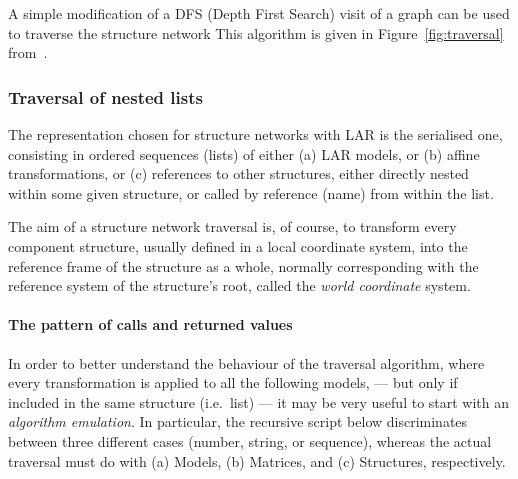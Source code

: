 \documentclass[11pt,oneside]{article}	%
\begin{document}
A simple modification of a DFS (Depth First Search) visit of a graph can be used to traverse the structure network This algorithm is given in Figure~\ref{fig:traversal} from~\cite{Paoluzzi2003a}. 

\subsubsection{Traversal of nested lists}

The representation chosen for structure networks with LAR is the serialised one, consisting in ordered sequences (lists) of either (a) LAR models, or (b) affine transformations, or (c) references to other structures, either directly nested within some given structure, or called by reference (name) from within the list.

The aim of a structure network traversal is, of course, to transform every component structure, usually defined in a local coordinate system, into the reference frame of the structure as a whole, normally corresponding with the reference system of the structure's root, called the \emph{world coordinate} system.

\paragraph{The pattern of calls and returned values}

In order to better understand the behaviour of the traversal algorithm, where every transformation is applied to all the following models, --- but only if included in the same structure  (i.e.~list) --- it may be very useful to start with an \emph{algorithm emulation}. In particular, the recursive script below discriminates between three different cases (number, string, or sequence), whereas the actual traversal must do with (a) Models, (b) Matrices, and (c) Structures, respectively.
\end{document}
